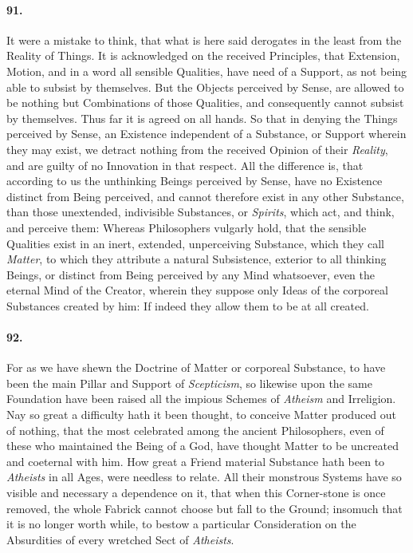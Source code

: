 \documentclass[]{article}
\newenvironment{sectionbody}{\begin{multicols}{2}}{\end{multicols}}
\begin{document}
\begin{sectionbody}
\paragraph{91.} It were a mistake to think, that what is here said derogates in
the least from the Reality of Things.  It is acknowledged on the
received Principles, that Extension, Motion, and in a word all
sensible Qualities, have need of a Support, as not being able to
subsist by themselves.  But the Objects perceived by Sense, are
allowed to be nothing but Combinations of those Qualities, and
consequently cannot subsist by themselves.  Thus far it is agreed
on all hands.  So that in denying the Things perceived by Sense,
an Existence independent of a Substance, or Support wherein they
may exist, we detract nothing from the received Opinion of their
\emph{Reality}, and are guilty of no Innovation in that
respect.  All the difference is, that according to us the
unthinking Beings perceived by Sense, have no Existence distinct
from Being perceived, and cannot therefore exist in any other
Substance, than those unextended, indivisible Substances, or
\emph{Spirits}, which act, and think, and perceive them: Whereas
Philosophers vulgarly hold, that the sensible Qualities exist in
an inert, extended, unperceiving Substance, which they call
\emph{Matter}, to which they attribute a natural Subsistence,
exterior to all thinking Beings, or distinct from Being perceived
by any Mind whatsoever, even the eternal Mind of the {\sc Creator},
wherein they suppose only Ideas of the corporeal Substances
created by him: If indeed they allow them to be at all created.



\paragraph{92.} For as we have shewn the Doctrine of Matter or corporeal
Substance, to have been the main Pillar and Support of
\emph{Scepticism}, so likewise upon the same Foundation have
been raised all the impious Schemes of \emph{Atheism} and
Irreligion.  Nay so great a difficulty hath it been thought, to
conceive Matter produced out of nothing, that the most celebrated
among the ancient Philosophers, even of these who maintained the
Being of a {\sc God}, have thought Matter to be uncreated and coeternal
with him.  How great a Friend material Substance hath been to
\emph{Atheists} in all Ages, were needless to relate.  All
their monstrous Systems have so visible and necessary a
dependence on it, that when this Corner-stone is once removed,
the whole Fabrick cannot choose but fall to the Ground; insomuch
that it is no longer worth while, to bestow a particular
Consideration on the Absurdities of every wretched Sect of
\emph{Atheists}.




\end{sectionbody}
\end{document}
